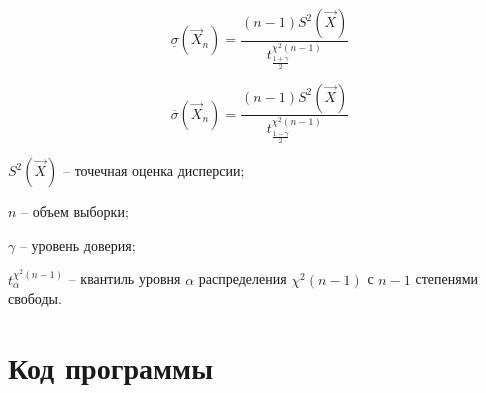 \documentclass[12pt]{report}
\begin{document}
\begin{equation}
\underline\sigma(\vec X_n)= \frac{(n-1)S^2(\vec X)}{t^{\chi^2(n-1)}_{\frac{1+\gamma}{2}}}
\end{equation}

\begin{equation}
\overline\sigma(\vec X_n)= \frac{(n-1)S^2(\vec X)}{t^{\chi^2(n-1)}_{\frac{1-\gamma}{2}}}
\end{equation}

$S^2(\vec X)$ -- точечная оценка дисперсии;

$n$ -- объем выборки;

$\gamma$ -- уровень доверия;

$t^{\chi^2(n-1)}_{\alpha}$ -- квантиль уровня $\alpha$ распределения $\chi^2(n-1)$ с $n - 1$ степенями свободы.



\chapter*{Код программы}
\end{document}
